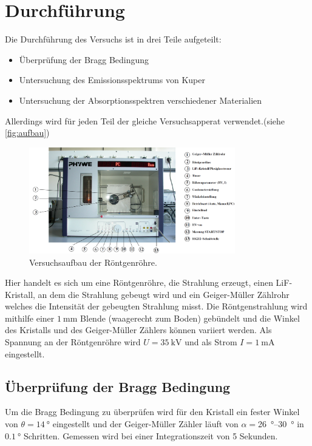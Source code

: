 \section{Durchführung}
\label{sec:Durchführung}

Die Durchführung des Versuchs ist in drei Teile aufgeteilt:
\begin{itemize}
    \item Überprüfung der Bragg Bedingung
    \item Untersuchung des Emissionsspektrums von Kuper
    \item Untersuchung der Absorptionsspektren verschiedener Materialien
\end{itemize}
Allerdings wird für jeden Teil der gleiche Versuchsapperat verwendet.(siehe \autoref{fig:aufbau})

\begin{figure}
    \centering
    \includegraphics[width=0.8\textwidth]{images/aufbau.png}
    \caption{Versuchsaufbau der Röntgenröhre.}
    \label{fig:aufbau}
\end{figure}

Hier handelt es sich um eine Röntgenröhre, die Strahlung erzeugt, einen LiF-Kristall, an dem die Strahlung gebeugt wird und ein Geiger-Müller Zählrohr welches die Intensität der gebeugten Strahlung misst.
Die Röntgenstrahlung wird mithilfe einer $\SI{1}{\milli\metre}$ Blende (waagerecht zum Boden) gebündelt und die Winkel des Kristalls und des Geiger-Müller Zählers können variiert werden.
Als Spannung an der Röntgenröhre wird $U=\SI{35}{\kilo\volt}$ und als Strom $I=\SI{1}{\milli\ampere}$ eingestellt.


\subsection{Überprüfung der Bragg Bedingung}
\label{ssec:bragg}

Um die Bragg Bedingung zu überprüfen wird für den Kristall ein fester Winkel von $\theta=\SI{14}{\degree}$ eingestellt und der Geiger-Müller Zähler läuft von $\alpha=$\SIrange{26}{30}{\degree} in $\SI{0.1}{\degree}$ Schritten.
Gemessen wird bei einer Integrationszeit von 5 Sekunden.


